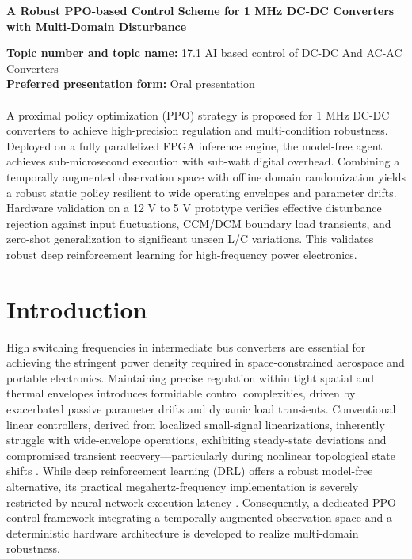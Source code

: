 \documentclass[a4paper,12pt]{article}
\begin{document}
\begin{center}
    {\Large \bfseries A Robust PPO-based Control Scheme for 1 MHz DC-DC Converters with Multi-Domain Disturbance} \\[1em]
\end{center}

\noindent \textbf{Topic number and topic name:} 17.1 AI based control of DC-DC And AC-AC Converters\\
\textbf{Preferred presentation form:} Oral presentation \\[1em]
\vspace{-10pt}  %
\\

A proximal policy optimization (PPO) strategy is proposed for 1 MHz DC-DC converters to achieve high-precision regulation and multi-condition robustness. Deployed on a fully parallelized FPGA inference engine, the model-free agent achieves sub-microsecond execution with sub-watt digital overhead. Combining a temporally augmented observation space with offline domain randomization yields a robust static policy resilient to wide operating envelopes and parameter drifts. Hardware validation on a 12 V to 5 V prototype verifies effective disturbance rejection against input fluctuations, CCM/DCM boundary load transients, and zero-shot generalization to significant unseen L/C variations. This validates robust deep reinforcement learning for high-frequency power electronics.

\vspace{-10pt}  %
\section{Introduction}
\vspace{-5pt}  %

High switching frequencies in intermediate bus converters are essential for achieving the stringent power density required in space-constrained aerospace and portable electronics. Maintaining precise regulation within tight spatial and thermal envelopes introduces formidable control complexities, driven by exacerbated passive parameter drifts and dynamic load transients. Conventional linear controllers, derived from localized small-signal linearizations, inherently struggle with wide-envelope operations, exhibiting steady-state deviations and compromised transient recovery—particularly during nonlinear topological state shifts \cite{zhang2026}. While deep reinforcement learning (DRL) offers a robust model-free alternative, its practical megahertz-frequency implementation is severely restricted by neural network execution latency \cite{ye2024deep}. Consequently, a dedicated PPO control framework integrating a temporally augmented observation space and a deterministic hardware architecture is developed to realize multi-domain robustness.
\end{document}
